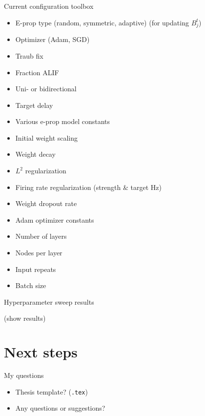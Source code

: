 \documentclass[t]{beamer}
\begin{document}
\begin{frame}{Current configuration toolbox}
	\renewcommand{\baselinestretch}{0.7}
	\footnotesize{
	\begin{itemize}[label=--]

    \item E-prop type (random, symmetric, adaptive) (for updating $B_j^t$)
    \item Optimizer (Adam, SGD)
    \item Traub fix
    \item Fraction ALIF
    \item Uni- or bidirectional
    \item Target delay
    \item Various e-prop model constants
    \item Initial weight scaling
    \item Weight decay
    \item $L^2$ regularization
    \item Firing rate regularization (strength \& target Hz)
    \item Weight dropout rate
    \item Adam optimizer constants
    \item Number of layers
    \item Nodes per layer
    \item Input repeats
    \item Batch size
  \end{itemize}
  }	\renewcommand{\baselinestretch}{1}
\end{frame}


\begin{frame}{Hyperparameter sweep results}

(show results)

\end{frame}


\section{Next steps}
\begin{frame}{My questions}
\begin{itemize}[label=--]
\item Thesis template? (\texttt{.tex})
\item Any questions or suggestions?
\end{itemize}


\end{frame}
\end{document}

